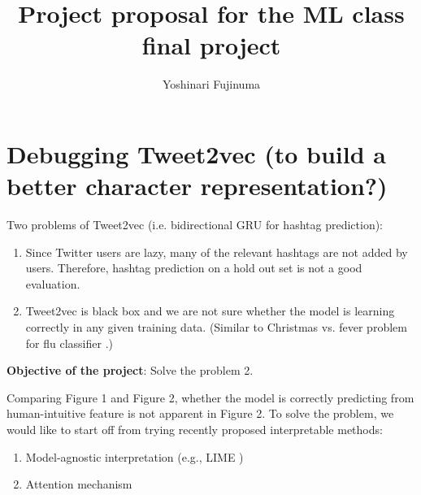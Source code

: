 \documentclass[11pt]{article}
\begin{document}
\vspace{-1cm}
\title{\vspace{-2ex}Project proposal for the ML class final project\vspace{-2ex}}
\author{Yoshinari Fujinuma\vspace{-2ex}}
\date{\vspace{-2ex}}
\maketitle

\vspace{-0.5cm}

\section{Debugging Tweet2vec (to build a better character representation?)}

Two problems of Tweet2vec \cite{dhingra-EtAl:2016:P16-2} (i.e. bidirectional GRU for hashtag prediction):

\begin{enumerate}
 \setlength\itemsep{0.01em}
 \item  Since Twitter users are lazy, many of the relevant hashtags are not added by users. Therefore, hashtag prediction on a hold out set is not a good evaluation.
 \item Tweet2vec is black box and we are not sure whether the model is learning correctly in any given training data. (Similar to Christmas vs. fever problem for flu classifier \cite{Paul-2016} .)
\end{enumerate}

{\bf Objective of the project}: Solve the problem 2.

Comparing Figure 1 and Figure 2, whether the model is correctly predicting from human-intuitive feature is not apparent in Figure 2. %
To solve the problem, we would like to start off from trying recently proposed interpretable methods:
\begin{enumerate}
 \item Model-agnostic interpretation (e.g., LIME \cite{Ribeiro:2016})
 \item Attention mechanism \cite{luong-pham-manning:2015:EMNLP}
\end{enumerate}
\end{document}

